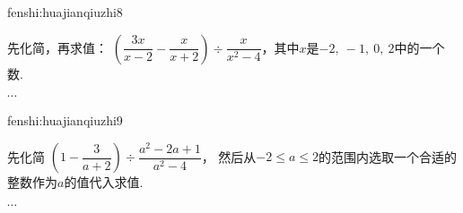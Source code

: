 \begin{defproblem}{fenshi:huajianqiuzhi8}%
\begin{onlyproblem}%
先化简，再求值：
$\left(\dfrac{3x}{x-2}-\dfrac{x}{x+2}\right)\div \dfrac{x}{x^2-4}$，其中$x$是$-2,~-1,~0,~2$中的一个数.
\end{onlyproblem}%
\begin{onlysolution}%
$\cdots$
\end{onlysolution}%
\end{defproblem}

\begin{defproblem}{fenshi:huajianqiuzhi9}%
\begin{onlyproblem}%
先化简
$\left(1-\dfrac{3}{a+2}\right)\div \dfrac{a^2-2a+1}{a^2-4}$，
然后从$-2\leqslant{}a\leqslant{}2$的范围内选取一个合适的整数作为$a$的值代入求值.
\end{onlyproblem}%
\begin{onlysolution}%
$\cdots$
\end{onlysolution}%
\end{defproblem}


